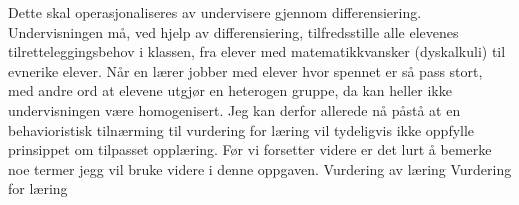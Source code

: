 \documentclass[main.tex]{subfiles}
\begin{document}
Dette skal operasjonaliseres av undervisere gjennom differensiering.  Undervisningen må, ved hjelp av differensiering, 
tilfredsstille alle elevenes tilretteleggingsbehov i klassen, fra elever med matematikkvansker (dyskalkuli) til evnerike elever. Når en lærer jobber 
med elever hvor spennet er så pass stort, med andre ord at elevene utgjør en heterogen gruppe, da kan heller ikke undervisningen 
være homogenisert. Jeg kan derfor allerede nå påstå at en behavioristisk tilnærming til vurdering for læring vil tydeligvis ikke oppfylle prinsippet om tilpasset opplæring.
\newline
\newline
Før vi forsetter videre er det lurt å bemerke noe termer jegg vil bruke videre i denne oppgaven.
Vurdering av læring
Vurdering for læring
\end{document}
